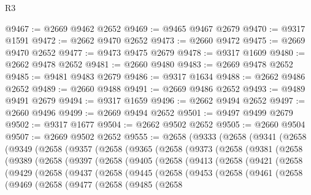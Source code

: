\begin{lexlean}{R3}
\begin{coremodule}
@9467 := @2669 @9462 @2652
@9469 := @9465 @9467 @2679
@9470 := @9317 @1591
@9472 := @2662 @9470 @2652
@9473 := @2660 @9472
@9475 := @2669 @9470 @2652
@9477 := @9473 @9475 @2679
@9478 := @9317 @1609
@9480 := @2662 @9478 @2652
@9481 := @2660 @9480
@9483 := @2669 @9478 @2652
@9485 := @9481 @9483 @2679
@9486 := @9317 @1634
@9488 := @2662 @9486 @2652
@9489 := @2660 @9488
@9491 := @2669 @9486 @2652
@9493 := @9489 @9491 @2679
@9494 := @9317 @1659
@9496 := @2662 @9494 @2652
@9497 := @2660 @9496
@9499 := @2669 @9494 @2652
@9501 := @9497 @9499 @2679
@9502 := @9317 @1677
@9504 := @2662 @9502 @2652
@9505 := @2660 @9504
@9507 := @2669 @9502 @2652
@9555 := @2658
    (@9333
      (@2658
        (@9341
          (@2658
            (@9349
              (@2658
                (@9357
                  (@2658
                    (@9365
                      (@2658
                        (@9373
                          (@2658
                            (@9381
                              (@2658
                                (@9389
                                  (@2658
                                    (@9397
                                      (@2658
                                        (@9405
                                          (@2658
                                            (@9413
                                              (@2658
                                                (@9421
                                                  (@2658
                                                    (@9429
                                                      (@2658
                                                        (@9437
                                                          (@2658
                                                            (@9445
                                                              (@2658
                                                                (@9453
                                                                  (@2658
                                                                    (@9461
                                                                      (@2658
                                                                        (@9469
                                                                          (@2658
                                                                            (@9477
                                                                              (@2658
                                                                                (@9485
                                                                                  (@2658

\end{coremodule}
\end{lexlean}
